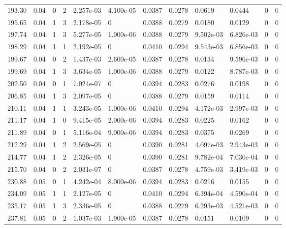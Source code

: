 \documentclass[preview]{standalone}
\begin{document}
{{{\begin{tabular}{L{1.2cm}C{1.2cm} C{0.3cm}C{0.5cm} C{1.4cm}C{1.4cm} C{1.4cm}C{1.4cm} C{1.6cm}C{1.6cm} C{1.6cm}C{1.6cm}}
  193.30  &  0.04  & 0     &  2 &  2.257e-03  & 4.100e-05  &  0.0387&   0.0278& 0.0619 & 0.0444   &  0 & 0  \\ 
  195.65  &  0.04  & 1     &  3 &  2.178e-05  & 0  &  0.0388&   0.0279& 0.0180 & 0.0129   &  0 & 0  \\ 
  197.74  &  0.04  & 1     &  3 &  5.277e-05  & 1.000e-06  &  0.0388&   0.0279& 9.502e-03 & 6.826e-03   &  0 & 0  \\ 
  198.29  &  0.04  & 1     &  1 &  2.192e-05  & 0  &  0.0410&   0.0294& 9.543e-03 & 6.856e-03   &  0 & 0  \\ 
  199.67  &  0.04  & 0     &  2 &  1.437e-03  & 2.600e-05  &  0.0387&   0.0278& 0.0134 & 9.596e-03   &  0 & 0  \\ 
  199.69  &  0.04  & 1     &  3 &  3.634e-05  & 1.000e-06  &  0.0388&   0.0279& 0.0122 & 8.787e-03   &  0 & 0  \\ 
  202.50  &  0.04  & 0     &  1 &  7.024e-07  & 0  &  0.0394&   0.0283& 0.0276 & 0.0198   &  0 & 0  \\ 
  206.85  &  0.04  & 1     &  3 &  2.097e-05  & 0  &  0.0388&   0.0279& 0.0159 & 0.0114   &  0 & 0  \\ 
  210.11  &  0.04  & 1     &  1 &  3.243e-05  & 1.000e-06  &  0.0410&   0.0294& 4.172e-03 & 2.997e-03   &  0 & 0  \\ 
  211.17  &  0.04  & 1     &  0 &  9.415e-05  & 2.000e-06  &  0.0394&   0.0283& 0.0225 & 0.0162   &  0 & 0  \\ 
  211.89  &  0.04  & 0     &  1 &  5.116e-04  & 9.000e-06  &  0.0394&   0.0283& 0.0375 & 0.0269   &  0 & 0  \\ 
  212.29  &  0.04  & 1     &  2 &  2.569e-05  & 0  &  0.0390&   0.0281& 4.097e-03 & 2.943e-03   &  0 & 0  \\ 
  214.77  &  0.04  & 1     &  2 &  2.326e-05  & 0  &  0.0390&   0.0281& 9.782e-04 & 7.030e-04   &  0 & 0  \\ 
  215.70  &  0.04  & 0     &  2 &  2.031e-07  & 0  &  0.0387&   0.0278& 4.759e-03 & 3.419e-03   &  0 & 0  \\ 
  230.88  &  0.05  & 0     &  1 &  4.242e-04  & 8.000e-06  &  0.0394&   0.0283& 0.0216 & 0.0155   &  0 & 0  \\ 
  234.09  &  0.05  & 1     &  1 &  2.127e-05  & 0  &  0.0410&   0.0294& 6.394e-04 & 4.590e-04   &  0 & 0  \\ 
  235.17  &  0.05  & 1     &  3 &  2.336e-05  & 0  &  0.0388&   0.0279& 6.293e-03 & 4.521e-03   &  0 & 0  \\ 
  237.81  &  0.05  & 0     &  2 &  1.037e-03  & 1.900e-05  &  0.0387&   0.0278& 0.0151 & 0.0109   &  0 & 0  \\ 

\end{tabular}}}}
\end{document}
